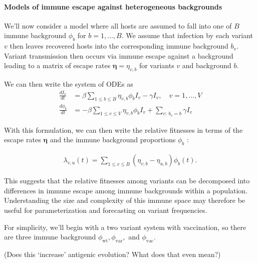 \documentclass[12pt,oneside,letterpaper]{article}
\renewcommand{\vec}[1]{\boldsymbol{#1}}
\newcommand{\wt}{\text{wt}}
\newcommand{\var}{\text{var}}
\newcommand{\vac}{\text{vac}}
\begin{document}
\paragraph{Models of immune escape against heterogeneous backgrounds}%

We'll now consider a model where all hosts are assumed to fall into one of $B$ immune background $\phi_{b}$ for $b =1, \ldots, B$.
We assume that infection by each variant $v$ then leaves recovered hosts into the corresponding immune background $b_{v}$.
Variant transmission then occurs via immune escape against a background leading to a matrix of escape rates $\vec{\eta} = \eta_{v,b}$ for variants $v$ and background $b$.

We can then write the system of ODEs as 
\begin{align*}
    \frac{d I_{v}}{dt} &= \beta \sum_{1\leq b \leq B} \eta_{v, b} \phi_{b} I_{v} - \gamma I_{v}, \quad v = 1, \ldots, V\\
    \frac{d \phi_{b}}{dt} &= - \beta \sum_{1\leq v \leq V} \eta_{v,b}\phi_{b} I_{v} +  \sum_{v:\ b_{v} = b} \gamma I_{v}
\end{align*}

With this formulation, we can then write the relative fitnesses in terms of the escape rates $\vec{\eta}$ and the immune background proportions $\phi_{b}$ :

\begin{align*}
    \lambda_{v, u}(t) = \sum_{1\leq v \leq B}(\eta_{v,b} - \eta_{u,b}) \phi_{b}(t).
\end{align*}

This suggests that the relative fitnesses among variants can be decomposed into differences in immune escape among immune backgrounds within a population.
Understanding the size and complexity of this immune space may therefore be useful for parameterization and forecasting on variant frequencies.


For simplicity, we'll begin with a two variant system with vaccination, so there are three immune background $\phi_{\wt}, \phi_{\var},$ and $\phi_{\vac}$.

(Does this `increase' antigenic evolution? What does that even mean?)
\end{document}
